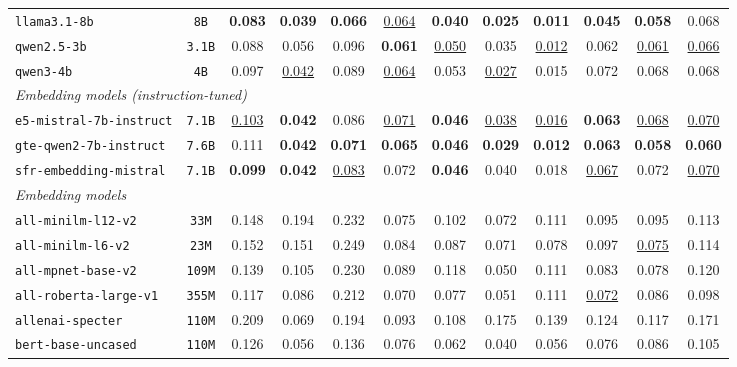 \documentclass{article}
\begin{document}
\begin{table}[htbp]
{\begin{tabular}{lccccccccccc}
\texttt{llama3.1-8b} & \texttt{8B} & \textbf{0.083} & \textbf{0.039} & \textbf{0.066} & \underline{0.064} & \textbf{0.040} & \textbf{0.025} & \textbf{0.011} & \textbf{0.045} & \textbf{0.058} & 0.068 \\
\texttt{qwen2.5-3b} & \texttt{3.1B} & 0.088 & 0.056 & 0.096 & \textbf{0.061} & \underline{0.050} & 0.035 & \underline{0.012} & 0.062 & \underline{0.061} & \underline{0.066} \\
\texttt{qwen3-4b} & \texttt{4B} & 0.097 & \underline{0.042} & 0.089 & \underline{0.064} & 0.053 & \underline{0.027} & 0.015 & 0.072 & 0.068 & 0.068 \\
\midrule
\multicolumn{12}{l}{\textit{Embedding models (instruction-tuned)}} \\
\midrule
\texttt{e5-mistral-7b-instruct} & \texttt{7.1B} & \underline{0.103} & \textbf{0.042} & 0.086 & \underline{0.071} & \textbf{0.046} & \underline{0.038} & \underline{0.016} & \textbf{0.063} & \underline{0.068} & \underline{0.070} \\
\texttt{gte-qwen2-7b-instruct} & \texttt{7.6B} & 0.111 & \textbf{0.042} & \textbf{0.071} & \textbf{0.065} & \textbf{0.046} & \textbf{0.029} & \textbf{0.012} & \textbf{0.063} & \textbf{0.058} & \textbf{0.060} \\
\texttt{sfr-embedding-mistral} & \texttt{7.1B} & \textbf{0.099} & \textbf{0.042} & \underline{0.083} & 0.072 & \textbf{0.046} & 0.040 & 0.018 & \underline{0.067} & 0.072 & \underline{0.070} \\
\midrule
\multicolumn{12}{l}{\textit{Embedding models}} \\
\midrule
\texttt{all-minilm-l12-v2} & \texttt{33M} & 0.148 & 0.194 & 0.232 & 0.075 & 0.102 & 0.072 & 0.111 & 0.095 & 0.095 & 0.113 \\
\texttt{all-minilm-l6-v2} & \texttt{23M} & 0.152 & 0.151 & 0.249 & 0.084 & 0.087 & 0.071 & 0.078 & 0.097 & \underline{0.075} & 0.114 \\
\texttt{all-mpnet-base-v2} & \texttt{109M} & 0.139 & 0.105 & 0.230 & 0.089 & 0.118 & 0.050 & 0.111 & 0.083 & 0.078 & 0.120 \\
\texttt{all-roberta-large-v1} & \texttt{355M} & 0.117 & 0.086 & 0.212 & 0.070 & 0.077 & 0.051 & 0.111 & \underline{0.072} & 0.086 & 0.098 \\
\texttt{allenai-specter} & \texttt{110M} & 0.209 & 0.069 & 0.194 & 0.093 & 0.108 & 0.175 & 0.139 & 0.124 & 0.117 & 0.171 \\
\texttt{bert-base-uncased} & \texttt{110M} & 0.126 & 0.056 & 0.136 & 0.076 & 0.062 & 0.040 & 0.056 & 0.076 & 0.086 & 0.105 \\

\end{tabular}}
\end{table}
\end{document}
